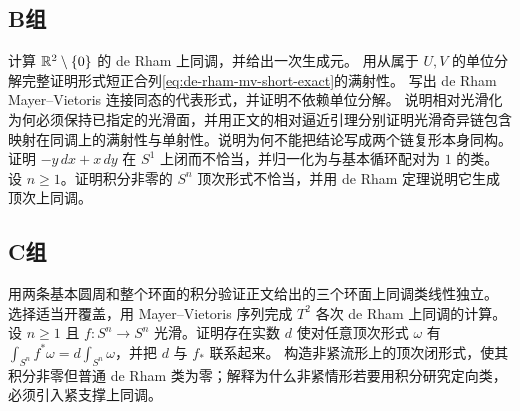 \subsection*{B组}
\begin{enumerate}[label=\textbf{\thechapter.\arabic*.},resume]
计算 $\mathbb{R}^2\setminus\{0\}$ 的 de Rham 上同调，并给出一次生成元。
用从属于 $U,V$ 的单位分解完整证明形式短正合列\eqref{eq:de-rham-mv-short-exact}的满射性。
写出 de Rham Mayer--Vietoris 连接同态的代表形式，并证明不依赖单位分解。
说明相对光滑化为何必须保持已指定的光滑面，并用正文的相对逼近引理分别证明光滑奇异链包含映射在同调上的满射性与单射性。说明为何不能把结论写成两个链复形本身同构。
证明 $-y\,dx+x\,dy$ 在 $S^1$ 上闭而不恰当，并归一化为与基本循环配对为 $1$ 的类。
设 $n\geq1$。证明积分非零的 $S^n$ 顶次形式不恰当，并用 de Rham 定理说明它生成顶次上同调。
\end{enumerate}
\subsection*{C组}
\begin{enumerate}[label=\textbf{\thechapter.\arabic*.},resume]
用两条基本圆周和整个环面的积分验证正文给出的三个环面上同调类线性独立。
选择适当开覆盖，用 Mayer--Vietoris 序列完成 $T^2$ 各次 de Rham 上同调的计算。
设 $n\geq1$ 且 $f:S^n\to S^n$ 光滑。证明存在实数 $d$ 使对任意顶次形式 $\omega$ 有 $\int_{S^n}f^*\omega=d\int_{S^n}\omega$，并把 $d$ 与 $f_*$ 联系起来。
构造非紧流形上的顶次闭形式，使其积分非零但普通 de Rham 类为零；解释为什么非紧情形若要用积分研究定向类，必须引入紧支撑上同调。
\end{enumerate}
